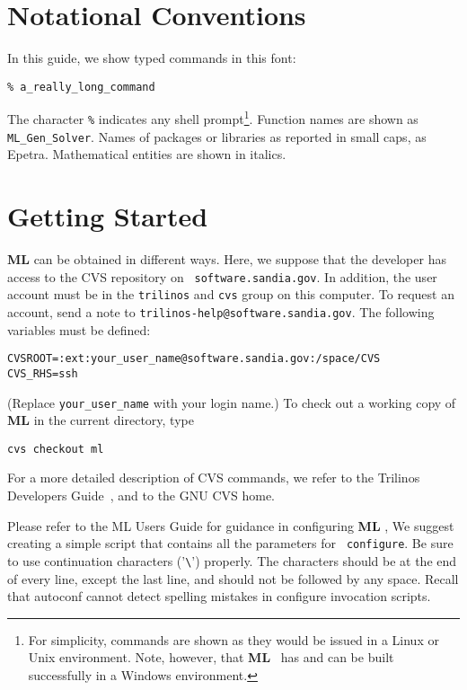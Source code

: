 \documentclass[10pt,letter,relax]{SANDreport}
\newcommand{\ML}     {{\bf ML }}
\begin{document}

\section{Notational Conventions}

In this guide, we show typed commands in this font:
\begin{verbatim}
% a_really_long_command
\end{verbatim}
The character \verb!%! indicates any shell prompt\footnote{For
  simplicity, commands are shown as they would be issued in a Linux or
  Unix environment.  Note, however, that \ML\ has and can be built
  successfully in a Windows environment.}.
Function names are shown as {\tt ML\_Gen\_Solver}.  Names of packages or
libraries as reported in small caps, as {\sc Epetra}. Mathematical
entities are shown in italics.


\section{Getting Started}
\label{sec:started}

\ML can be obtained in different ways. Here, we suppose that the
developer has access to the CVS repository on {\tt
  software.sandia.gov}. In addition, the user account must be in the
{\tt trilinos} and {\tt cvs} group on this computer. To request an
account, send a note to {\tt trilinos-help@software.sandia.gov}.  The
following variables must be defined:
\begin{verbatim}
CVSROOT=:ext:your_user_name@software.sandia.gov:/space/CVS
CVS_RHS=ssh
\end{verbatim}
(Replace \verb!your_user_name! with your login name.) To check out a
working copy of \ML in the current directory, type
\begin{verbatim}
cvs checkout ml
\end{verbatim}
For a more detailed description of CVS commands, we refer to the
Trilinos Developers Guide~\cite{Trilinos-Dev-Guide}, and to the GNU CVS home.

Please refer to the ML Users Guide for guidance in configuring \ML,
We suggest creating a simple script that contains all the parameters for {\tt
configure}. Be sure to use continuation characters ('\verb!\!') properly.
The characters should be at the end of every line, except the last line, and
should not be followed by any space.  Recall that autoconf cannot detect
spelling mistakes in configure invocation scripts.
\end{document}
